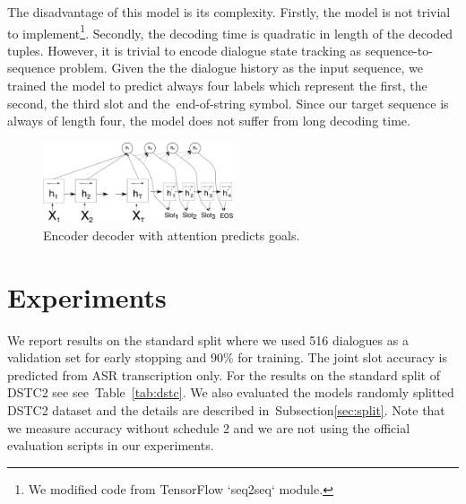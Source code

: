 \documentclass{itatnew}
\def\PB#1{\textcolor{red}{PB: \textit{#1}}}
\def\todo#1{\textcolor{purple}{todo: \textit{#1}}}
\begin{document}
The disadvantage of this model is its complexity.
Firstly, the model is not trivial to implement\footnote{We modified code from TensorFlow `seq2seq` module.}. Secondly, the decoding time is quadratic in length of the decoded tuples.
However, it is trivial to encode dialogue state tracking as sequence-to-sequence problem. Given the the dialogue history as the input sequence, we trained the model to predict always four labels which represent the first, the second, the third slot and the~end-of-string symbol.
Since our target sequence is always of length four, the model does not suffer from long decoding time. 
\begin{figure}
\includegraphics[width=0.5\textwidth]{encdec}
\caption{Encoder decoder with attention predicts goals.}
\label{fig:encdec}
\end{figure}

\section{Experiments}
\label{sec:exp}

We report results on the standard split where we used 516 dialogues as a validation set for early stopping\cite{prechelt1998early} and 90\% for training. The joint slot accuracy is predicted from ASR transcription only.
For the results on the standard split of DSTC2 see see~Table~\ref{tab:dstc}.
We also evaluated the models randomly splitted DSTC2 dataset and the details are described in~Subsection\ref{sec:split}.
Note that we measure accuracy without schedule 2 and we are not using the official evaluation scripts in our experiments.

\end{document}
